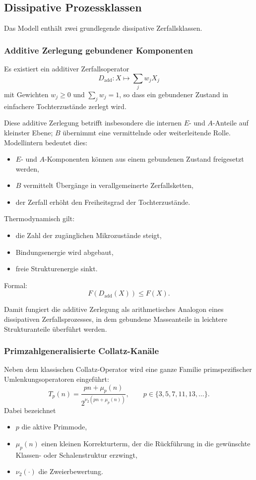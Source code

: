 \documentclass[11pt,a4paper]{article}
\theoremstyle{definition}
\begin{document}
\subsection{Dissipative Prozessklassen}

Das Modell enthält zwei grundlegende dissipative Zerfallsklassen.

\subsubsection{Additive Zerlegung gebundener Komponenten}

Es existiert ein additiver Zerfallsoperator
\[
D_{\mathrm{add}}:X\mapsto \sum_j w_j X_j
\]
mit Gewichten $w_j\ge 0$ und $\sum_j w_j=1$, so dass ein gebundener Zustand in einfachere Tochterzustände zerlegt wird.

Diese additive Zerlegung betrifft insbesondere die internen $E$- und $A$-Anteile auf kleinster Ebene; $B$ übernimmt eine vermittelnde oder weiterleitende Rolle. Modellintern bedeutet dies:
\begin{itemize}
	\item $E$- und $A$-Komponenten können aus einem gebundenen Zustand freigesetzt werden,
	\item $B$ vermittelt Übergänge in verallgemeinerte Zerfallsketten,
	\item der Zerfall erhöht den Freiheitsgrad der Tochterzustände.
\end{itemize}

Thermodynamisch gilt:
\begin{itemize}
	\item die Zahl der zugänglichen Mikrozustände steigt,
	\item Bindungsenergie wird abgebaut,
	\item freie Strukturenergie sinkt.
\end{itemize}

Formal:
\[
F\!\left(D_{\mathrm{add}}(X)\right)\le F(X).
\]

Damit fungiert die additive Zerlegung als arithmetisches Analogon eines dissipativen Zerfallsprozesses, in dem gebundene Masseanteile in leichtere Strukturanteile überführt werden.

\subsubsection{Primzahlgeneralisierte Collatz-Kanäle}

Neben dem klassischen Collatz-Operator wird eine ganze Familie primspezifischer Umlenkungsoperatoren eingeführt:
\[
T_p(n)=\frac{pn+\mu_p(n)}{2^{\nu_2(pn+\mu_p(n))}},
\qquad p\in\{3,5,7,11,13,\dots\}.
\]
Dabei bezeichnet
\begin{itemize}
	\item $p$ die aktive Primmode,
	\item $\mu_p(n)$ einen kleinen Korrekturterm, der die Rückführung in die gewünschte Klassen- oder Schalenstruktur erzwingt,
	\item $\nu_2(\cdot)$ die Zweierbewertung.
\end{itemize}
\end{document}
